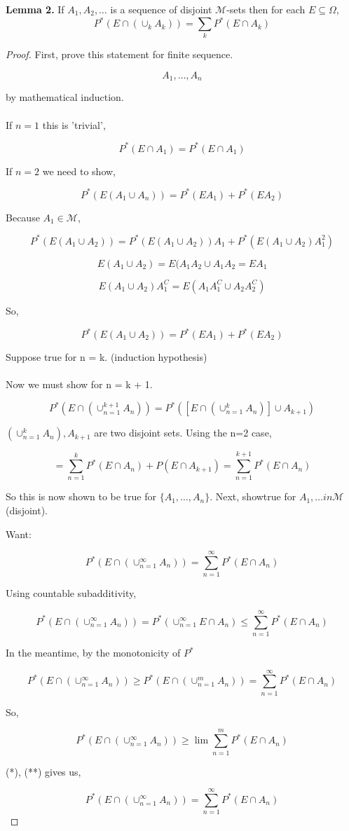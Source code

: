 \documentclass[11pt,fleqn]{book} %
\begin{document}
\textbf{Lemma 2.} If $A_1, A_2, \dots$ is a sequence of disjoint $\mathscr{M}$-sets then for each $E \subseteq \Omega$, 
$$P^*(E\cap(\cup_k A_k)) = \displaystyle \sum_k P^*(E \cap A_k) $$

\begin{proof}
	First, prove this statement for finite sequence. 

	$$A_1, \dots, A_n $$

	by mathematical induction. \\
	\\

	If $n=1$ this is 'trivial', 

	$$P^*(E\cap A_1) = P^*(E \cap A_1) $$

	If $n = 2$ we need to show, 

	$$ P^*(E  (A_1 \cup A_n)) = P^*(E A_1) + P^*(E A_2)$$

	Because $A_1 \in \mathscr{M}$, 

	$$P^*(E(A_1 \cup A_2)) = P^*(E(A_1 \cup A_2)) A_1 + P^*(E(A_1 \cup A_2)A_1^2)  $$

	$$E(A_1 \cup A_2) = E(A_1 A_2 \cup A_1 A_2 = EA_1$$

	$$E(A_1 \cup A_2) A_1^C = E(A_1 A_1^C \cup A_2 A_2^C)$$

	So, 

	$$P^*(E(A_1 \cup A_2)) = P^*(EA_1) + P^*(EA_2)$$

Suppose true for n = k. (induction hypothesis) \\
\\
Now we must show for n = k + 1.

$$P^* (E \cap (\cup_{n=1}^{k+1} A_n)) = P^*([E \cap (\cup_{n=1}^{k} A_n)] \cup A_{k+1}) $$

$ (\cup_{n=1}^{k} A_n), A_{k+1}$ are two disjoint sets. Using the n=2 case, 

$$ = \displaystyle \sum_{n=1}^k P^*(E \cap A_n) + P(E \cap A_{k+1}) = \displaystyle \sum_{n=1}^{k+1} P^*(E \cap A_n)  $$

So this is now shown to be true for $\{A_1, \dots, A_n \}$. Next, showtrue for $A_1, \dots in \mathscr{M}$ (disjoint).

Want: 

$$P^*(E \cap (\cup_{n=1}^\infty A_n)) = \displaystyle \sum_{n=1}^{\infty} P^*(E \cap A_n)  $$

Using countable subadditivity, 

$$ P^*(E \cap (\cup_{n=1}^\infty A_n)) = P^*(\displaystyle \cup_{n=1}^{\infty} E \cap A_n) \leq \displaystyle \sum_{n=1}^{\infty} P^*(E \cap A_n)$$

In the meantime, by the monotonicity of $P^*$

$$P^*(E \cap (\cup_{n=1}^\infty A_n)) \geq P^*(E \cap (\cup_{n=1}^m A_n)) =  \displaystyle \sum_{n=1}^{\infty} P^*(E \cap A_n)$$

So, 

$$P^*(E \cap (\cup_{n=1}^\infty A_n)) \geq \lim  \displaystyle \sum_{n=1}^{m} P^*(E \cap A_n)$$


(*), (**) gives us, 

$$P^*(E \cap (\cup_{n=1}^\infty A_n)) = \displaystyle \sum_{n=1}^{\infty} P^*(E \cap A_n)  $$

\end{proof}
\end{document}
